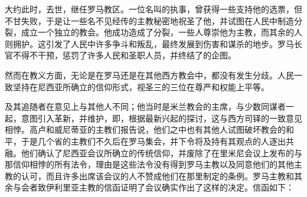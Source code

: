 大约此时，去世，继任罗马教区。一位名叫的执事，曾获得一些支持他的选票，但不甘失败，于是让一些名不见经传的主教秘密地祝圣了他，并试图在人民中制造分裂，成立一个独立的教会。他成功造成了分裂，一些人尊崇他为主教，而其余的人则拥护。这引发了人民中许多争斗和叛乱，最终发展到伤害和谋杀的地步。罗马长官不得不干预，惩罚了许多人民和圣职人员，并终结了的企图。\par

然而在教义方面，无论是在罗马还是在其他西方教会中，都没有发生分歧。人民一致坚持在尼西亚所确立的信仰形式，视圣三的三位在尊严和权能上平等。\par

及其追随者在意见上与其他人不同；他当时是米兰教会的主席，与少数同谋者一起，意图引入革新，并维护，即，根据最新兴起的探讨，这与西方司铎的一致意见相悖。高卢和威尼蒂亚的主教们报告说，他们之中也有其他人试图破坏教会的和平，于是几个省的主教们不久后在罗马集会，并下令将及持有其观点的人逐出共融。他们确认了尼西亚会议所确立的传统信仰，并废除了在里米尼会议上发布的与那信仰相悖的所有法令，理由是这些法令没有得到罗马主教以及同意他们的其他主教的认可，而且许多出席该会议的人不赞成他们在那里制定的条例。罗马主教和其余与会者致伊利里亚主教的信函证明了会议确实作出了这样的决定。信函如下：\par

\par

\par

\par

\par

\par


